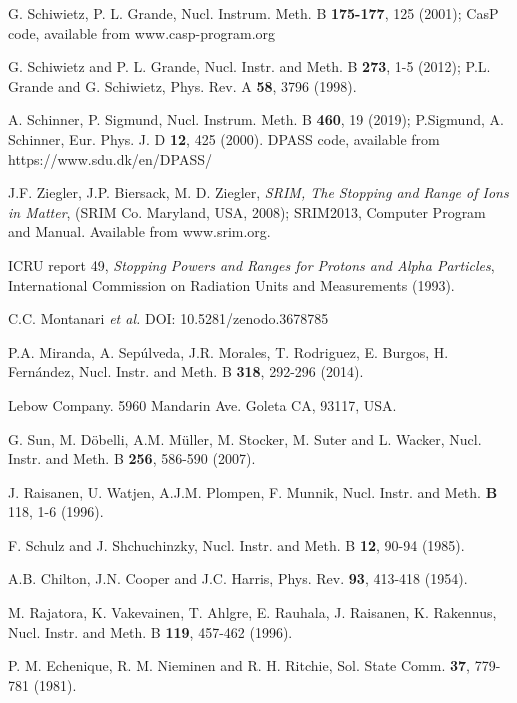 \documentclass[aps,pra,reprint,superscriptaddress]{revtex4-1}
\begin{document}
\begin{thebibliography}{00}
G. Schiwietz, P. L. Grande, 
Nucl. Instrum. Meth. B \textbf{175-177}, 125 (2001); 
CasP code, available from www.casp-program.org

G. Schiwietz and P. L. Grande,
Nucl. Instr. and Meth. B \textbf{273}, 1-5 (2012); 
P.L. Grande and G. Schiwietz,
Phys. Rev. A \textbf{58}, 3796 (1998).

A. Schinner, P. Sigmund, 
Nucl. Instrum. Meth. B \textbf{460}, 19 (2019); 
P.Sigmund, A. Schinner, 
Eur. Phys. J. D \textbf{12}, 425 (2000). 
DPASS code, available from https://www.sdu.dk/en/DPASS/

J.F. Ziegler, J.P. Biersack, M. D. Ziegler, 
\textit{SRIM, The Stopping and Range of Ions in Matter}, 
(SRIM Co. Maryland, USA, 2008); 
SRIM2013, Computer Program and Manual. Available from www.srim.org.

ICRU report 49, \textit{Stopping Powers and Ranges for Protons and Alpha Particles},
International Commission on Radiation Units and Measurements (1993).

C.C. Montanari {\it et al.} DOI: 10.5281/zenodo.3678785 

 P.A. Miranda, A. Sep\'ulveda, J.R. Morales, 
T. Rodriguez, E. Burgos, H. Fern\'andez,
Nucl. Instr. and Meth. B \textbf{318}, 292-296  (2014).

Lebow Company. 5960 Mandarin Ave. Goleta CA, 93117, USA.

G. Sun, M. D\"{o}belli, A.M. M\"{u}ller, M. Stocker, M. Suter and 
L. Wacker, 
Nucl. Instr. and Meth. B \textbf{256}, 586-590 (2007).

J. Raisanen, U. Watjen, A.J.M. Plompen, F. Munnik, 
Nucl. Instr. and Meth. \textbf{B} 118, 1-6  (1996).

F. Schulz and J. Shchuchinzky, 
Nucl. Instr. and Meth. B \textbf{12},  90-94 (1985).

A.B. Chilton, J.N. Cooper and J.C. Harris, 
Phys. Rev. \textbf{93}, 413-418  (1954).

M. Rajatora, K. Vakevainen, T. Ahlgre, E. Rauhala, J. Raisanen, 
K. Rakennus, 
Nucl. Instr. and Meth. B \textbf{119}, 457-462 (1996).

P. M. Echenique, R. M. Nieminen and R. H. Ritchie, 
Sol. State Comm. \textbf{37}, 779-781 (1981).


\end{thebibliography}
\end{document}
